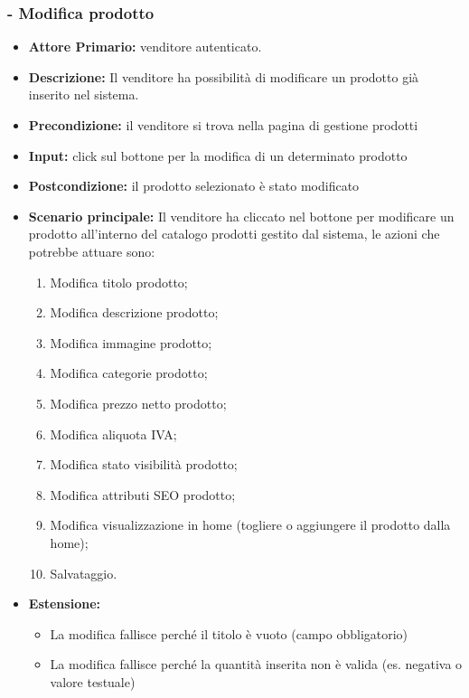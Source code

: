 \stepsubUserCase
\subsubsection{- Modifica  prodotto}
\begin{itemize}
    \item \textbf{Attore Primario:}  venditore autenticato.
    \item \textbf{Descrizione:} Il venditore ha possibilità di modificare un prodotto già inserito nel sistema.
    \item \textbf{Precondizione:} il venditore si trova nella pagina di gestione prodotti
    \item \textbf{Input:} click sul bottone per la modifica di un determinato prodotto
    \item \textbf{Postcondizione:} il prodotto selezionato è stato modificato
    \item \textbf{Scenario principale:} Il venditore ha cliccato nel bottone per modificare un prodotto all’interno del catalogo prodotti gestito dal sistema, le azioni che potrebbe attuare sono: 
    \begin{enumerate}
        \item Modifica titolo prodotto;
        \item Modifica descrizione prodotto;
        \item Modifica immagine prodotto;
        \item Modifica categorie prodotto;
        \item Modifica prezzo netto prodotto;
        \item Modifica aliquota IVA;
        \item Modifica stato visibilità prodotto; 
        \item Modifica attributi SEO prodotto;
        \item Modifica visualizzazione in home (togliere o aggiungere il prodotto dalla home);
        \item Salvataggio.
    \end{enumerate}
    \item \textbf{Estensione:}
    \begin{itemize}
        \item La modifica fallisce perché il titolo è vuoto (campo obbligatorio) 
        \item La modifica fallisce perché la quantità inserita non è valida (es. negativa o valore testuale)
    \end{itemize}
\end{itemize}

